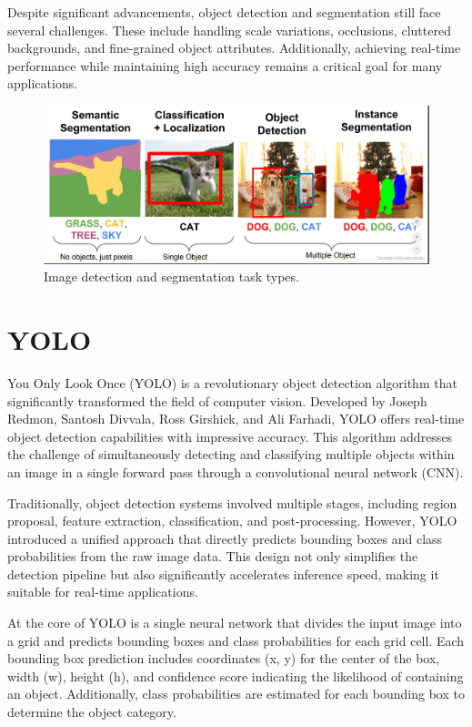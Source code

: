 Despite significant advancements, object detection and segmentation still face several challenges. These include handling scale variations, occlusions, cluttered backgrounds, and fine-grained object attributes. Additionally, achieving real-time performance while maintaining high accuracy remains a critical goal for many applications.

\begin{figure}
  \centering
  \includegraphics[width=\linewidth]{text/chapter_03/imgs/segmentation-types}
  \caption{Image detection and segmentation task types.}
  \label{fig:seg_type}
\end{figure}

\section{YOLO}
You Only Look Once (YOLO) is a revolutionary object detection algorithm that significantly transformed the field of computer vision. Developed by Joseph Redmon, Santosh Divvala, Ross Girshick, and Ali Farhadi, YOLO offers real-time object detection capabilities with impressive accuracy. This algorithm addresses the challenge of simultaneously detecting and classifying multiple objects within an image in a single forward pass through a convolutional neural network (CNN).

Traditionally, object detection systems involved multiple stages, including region proposal, feature extraction, classification, and post-processing. However, YOLO introduced a unified approach that directly predicts bounding boxes and class probabilities from the raw image data. This design not only simplifies the detection pipeline but also significantly accelerates inference speed, making it suitable for real-time applications.

At the core of YOLO is a single neural network that divides the input image into a grid and predicts bounding boxes and class probabilities for each grid cell. Each bounding box prediction includes coordinates (x, y) for the center of the box, width (w), height (h), and confidence score indicating the likelihood of containing an object. Additionally, class probabilities are estimated for each bounding box to determine the object category.

